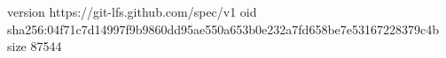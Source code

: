 version https://git-lfs.github.com/spec/v1
oid sha256:04f71c7d14997f9b9860dd95ae550a653b0e232a7fd658be7e53167228379c4b
size 87544
